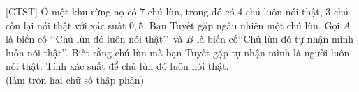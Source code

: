 \begin{bt}%
[CTST]%
Ở một khu rừng nọ có $7$ chú lùn, trong đó có $4$ chú luôn nói thật, $3$ chú còn lại nói thật với xác suất $0,5$. Bạn Tuyết gặp ngẫu nhiên một chú lùn. Gọi $A$ là biến cố \lq\lq Chú lùn đó luôn nói thật\rq\rq\, và $B$ là biến cố\lq\lq Chú lùn đó tự nhận mình luôn nói thật\rq\rq. Biết rằng chú lùn mà bạn Tuyết gặp tự nhận mình là người luôn nói thật. Tính xác suất để chú lùn đó luôn nói thật.\\
(làm tròn hai chữ số thập phân) 
\end{bt}

